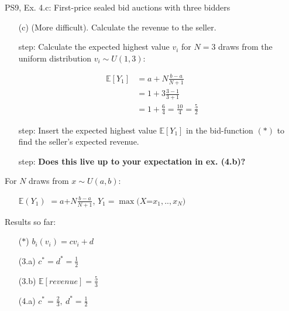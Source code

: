 \begin{frame}{PS9, Ex. 4.c: First-price sealed bid auctions with three bidders}
    \begin{itemize}
      \item[(c)] (More difficult). Calculate the revenue to the seller.
    \end{itemize}
    \vspace{-10pt}
    \begin{multicols}{2}
      \begin{itemize}
        \item[\nth{1} step:] Calculate the expected highest value $v_i$ for $N=3$ draws from the uniform distribution $v_i\sim U(1,3)$:
      \end{itemize}
      \vspace{-8pt}
      \begin{align*}
        \mathbb{E}[Y_1]&=a+N\frac{b-a}{N+1}\\
                       &=1+3\frac{3-1}{3+1}\\
                       &=1+\frac{6}{4}=\frac{10}{4}=\frac{5}{2}
      \end{align*}
      \vspace{-12pt}
      \begin{itemize}
        \item[\nth{2} step:] Insert the expected highest value $\mathbb{E}[Y_1]$ in the bid-function $(*)$  to find the seller's expected revenue.
        \item[\nth{3} step:] \textbf{Does this live up to your expectation in ex. (4.b)?}
      \end{itemize}
      \vfill\null\columnbreak
      For $N$ draws from $x\sim U(a, b):$
      \vspace{-6pt}
      \begin{enumerate}
        \item[$\mathbb{E}(Y_1)$] $=a$+$N\frac{b-a}{N+1}$, $Y_1=\max(X$=$x_1,..,x_N)$
      \end{enumerate}
      \vspace{-6pt}
      Results so far:
      \vspace{-6pt}
      \begin{itemize}
        \item[($*$)] $b_i(v_i) = cv_i+d$
        \item[(3.a)] $c^*=d^*=\frac{1}{2}$
        \item[(3.b)] $\mathbb{E}[revenue]=\frac{5}{3}$
        \item[(4.a)] $c^*=\frac{2}{3},\ d^*=\frac{1}{2}$

\end{itemize}
\end{multicols}
\end{frame}
